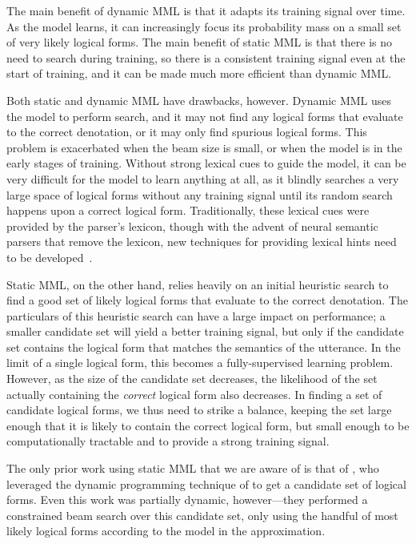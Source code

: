 The main benefit of dynamic MML is that it adapts its training signal over
time.  As the model learns, it can increasingly focus its probability mass on a
small set of very likely logical forms.  The main benefit of static MML is that
there is no need to search during training, so there is a consistent training
signal even at the start of training, and it can be made much more efficient
than dynamic MML\@.

Both static and dynamic MML have drawbacks, however.  Dynamic MML uses the
model to perform search, and it may not find any logical forms that evaluate to
the correct denotation, or it may only find spurious logical forms.  This
problem is exacerbated when the beam size is small, or when the model is in the
early stages of training.  Without strong lexical cues to guide the model, it
can be very difficult for the model to learn anything at all, as it blindly
searches a very large space of logical forms without any training signal until
its random search happens upon a correct logical form.  Traditionally, these
lexical cues were provided by the parser's lexicon, though with the advent of
neural semantic parsers that remove the lexicon, new techniques for providing
lexical hints need to be developed~\cite{goldman2017weakly}.

Static MML, on the other hand, relies heavily on an initial heuristic search to
find a good set of likely logical forms that evaluate to the correct
denotation.  The particulars of this heuristic search can have a large impact
on performance; a smaller candidate set will yield a better training signal,
but only if the candidate set contains the logical form that matches the
semantics of the utterance.  In the limit of a single logical form, this
becomes a fully-supervised learning problem.  However, as the size of the
candidate set decreases, the likelihood of the set actually containing the
\emph{correct} logical form also decreases.  In finding a set of candidate
logical forms, we thus need to strike a balance, keeping the set large enough
that it is likely to contain the correct logical form, but small enough to be
computationally tractable and to provide a strong training signal.

The only prior work using static MML that we are aware of is that of
\citet{krishnamurthy2017neural}, who leveraged the dynamic programming
technique of \citet{pasupat2016inferring} to get a candidate set of logical
forms.  Even this work was partially dynamic, however---they performed a
constrained beam search over this candidate set, only using the handful of most
likely logical forms according to the model in the approximation.

